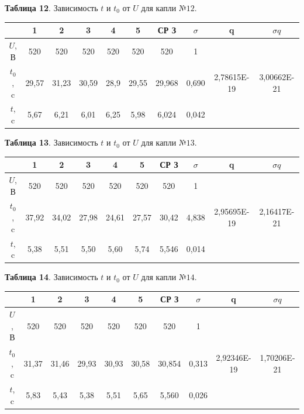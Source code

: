 \documentclass[11pt,a4paper]{article}
\begin{document}
\begin{table}
	\begin{center}
		\textbf{Таблица 12}. Зависимость $t$ и $t_0$ от $U$ для капли $№12$.\\
	\begin{tabular}{|c|c|c|c|c|c|c|c|c|c|}
		
			\hline
			 & \textbf{1} & \textbf{2} & \textbf{3} &\textbf{4} &\textbf{5} & СР З & $\sigma$ & q& $\sigma q$  \\ \hline
			$U$, В & 520 & 520 & 520 & 520 & 520 &  520 & 1  \\ \hline
			$t_0$, c  & 29,57 & 31,23 & 30,59 & 28,9 & 29,55 &  29,968 & 0,690 & 2,78615E-19
 & 3,00662E-21
\\ \hline
			$t$, c   & 5,67 & 6,21 & 6,01 & 6,25 & 5,98 & 6,024 & 0,042 \\ \hline
	\end{tabular}
	\end{center}
\end{table}
\begin{table}
	\begin{center}
		\textbf{Таблица 13}. Зависимость $t$ и $t_0$ от $U$ для капли $№13$.\\
	\begin{tabular}{|c|c|c|c|c|c|c|c|c|c|}
		
			\hline
			 & \textbf{1} & \textbf{2} & \textbf{3} &\textbf{4} &\textbf{5} & СР З & $\sigma$  & q& $\sigma q$ \\ \hline
			$U$, В & 520 & 520 & 520 & 520 & 520 &  520 &  1 \\ \hline
			$t_0$, c  & 37,92 & 34,02 & 27,98 & 24,61 & 27,57 & 30,42  & 4,838 & 2,95695E-19
 & 2,16417E-21
\\ \hline
			$t$, c   & 5,38 & 5,51 & 5,50 & 5,60 & 5,74 & 5,546 & 0,014 \\ \hline
	\end{tabular}
	\end{center}
\end{table}
\begin{table}[h!]
	\begin{center}
		\textbf{Таблица 14}. Зависимость $t$ и $t_0$ от $U$ для капли $№14$.\\
	\begin{tabular}{|c|c|c|c|c|c|c|c|c|c|}
		
			\hline
			 & \textbf{1} & \textbf{2} & \textbf{3} &\textbf{4} &\textbf{5} & СР З & $\sigma$  & q& $\sigma q$ \\ \hline
			$U$, В & 520 & 520 & 520 & 520 & 520 &  520 & 1  \\ \hline
			$t_0$, c  & 31,37 & 31,46 & 29,93 & 30,93 & 30,58 & 30,854  & 0,313 & 2,92346E-19
 & 1,70206E-21
\\ \hline
			$t$, c   & 5,83 & 5,43 & 5,38 & 5,51 & 5,65 & 5,560 & 0,026 \\ \hline
	\end{tabular}
	\end{center}
\end{table}
\end{document}
